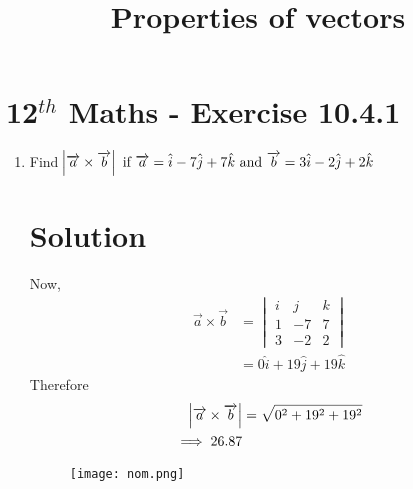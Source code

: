 \documentclass[journal,10pt,twocolumn]{article}
\begin{document}
\begin{center}
\title{\textbf{Properties of vectors}}
\date{\vspace{-5ex}} %
\maketitle
\end{center}
\setcounter{page}{1}
\section{12$^{th}$ Maths - Exercise 10.4.1}

\begin{enumerate}
\item Find $\abs{\overrightarrow{a}\times\overrightarrow{b}}\text{ if }\overrightarrow{a}=\hat{i}-7\hat{j}+7\hat{k}\text{ and }\overrightarrow{b}=3\hat{i}-2\hat{j}+2\hat{k}$
\section{Solution}
Now,
\begin{align}
\overrightarrow{a}\times \overrightarrow{b} &=\begin{vmatrix}
i & j & k\\
1 & -7 & 7\\
3 & -2 & 2
\end{vmatrix}\\
&=0\hat{i}+19\hat{j}+19\hat{k}
\end{align}
Therefore
\begin{align}
\abs{\overrightarrow{a}\times \overrightarrow{b}}&=\sqrt{0^2+19^2+19^2}\\
\implies 26.87
\end{align}
\begin{figure}[h]
	  \centering 
	  \texttt{[image: nom.png]}
	  \caption{}
	  \label{fig:nom.png}
	  \end{figure}
\end{enumerate}
\end{document}
